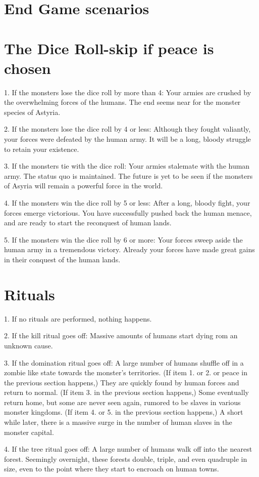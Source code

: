 \documentclass[green]{guildcamp2}
\begin{document}
\name{\gEndgame{}}

\section{End Game scenarios}

\section{The Dice Roll-skip if peace is chosen}
\begin{enum}
	\item 1. If the monsters lose the dice roll by more than 4: Your armies are crushed by the overwhelming forces of the humans. The end seems near for the monster species of Astyria.
	\item 2. If the monsters lose the dice roll by 4 or less: Although they fought valiantly, your forces were defeated by the human army. It will be a long, bloody struggle to retain your existence.
	\item 3. If the monsters tie with the dice roll: Your armies stalemate with the human army. The status quo is maintained. The future is yet to be seen if the monsters of Asyria will remain a powerful force in the world.
	\item 4. If the monsters win the dice roll by 5 or less: After a long, bloody fight, your forces emerge victorious. You have successfully pushed back the human menace, and are ready to start the reconquest of human lands.
	\item 5. If the monsters win the dice roll by 6 or more: Your forces sweep aside the human army in a tremendous victory. Already your forces have made great gains in their conquest of the human lands.
\end{enum}

\section {Rituals}
\begin{enum}
	\item 1. If no rituals are performed, nothing happens.
	\item 2. If the kill ritual goes off: Massive amounts of humans start dying rom an unknown cause.
	\item 3. If the domination ritual goes off: A large number of humans shuffle off in a zombie like state towards the monster's territories. (If item 1. or 2. or peace in the previous section happens,) They are quickly found by human forces and return to normal. (If item 3. in the previous section happens,) Some eventually return home, but some are never seen again, rumored to be slaves in various monster kingdoms. (If item 4. or 5. in the previous section happens,) A short while later, there is a massive surge in the number of human slaves in the monster capital.
	\item 4. If the tree ritual goes off: A large number of humans walk off into the nearest forest. Seemingly overnight, these forests double, triple, and even quadruple in size, even to the point where they start to encroach on human towns.
\end{enum}
\end{document}
